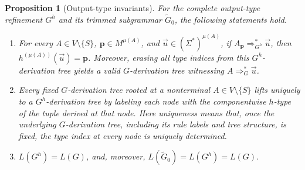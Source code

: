 \documentclass[11pt,a4paper]{article}
\newtheorem{proposition}[theorem]{Proposition}
\theoremstyle{remark}
\newcommand{\tuple}[1]{\vec{#1}}
\begin{document}
\begin{proposition}[Output-type invariants]
\label{prop:output-invariants}
For the complete output-type refinement \(G^h\) and its trimmed subgrammar
\(\widetilde G_0\), the following statements hold.
\begin{enumerate}[label=(\roman*),leftmargin=*]
\item For every \(A\in V\setminus\{S\}\),
      \(\mathbf p\in M^{\mu(A)}\), and
      \(\tuple u\in(\Sigma^*)^{\mu(A)}\), if
      \(A_{\mathbf p}\Rightarrow_{G^h}^*\tuple u\), then
      \(h^{(\mu(A))}(\tuple u)=\mathbf p\).  Moreover, erasing all type
      indices from this \(G^h\)-derivation tree yields a valid
      \(G\)-derivation tree witnessing \(A\Rightarrow_G^*\tuple u\).

\item Every fixed \(G\)-derivation tree rooted at a nonterminal
      \(A\in V\setminus\{S\}\) lifts uniquely to a \(G^h\)-derivation tree by
      labeling each node with the componentwise \(h\)-type of the tuple derived
      at that node.  Here uniqueness means that, once the underlying
      \(G\)-derivation tree, including its rule labels and tree structure, is
      fixed, the type index at every node is uniquely determined.

\item \(L(G^h)=L(G)\), and, moreover,
      \(L(\widetilde G_0)=L(G^h)=L(G)\).
\end{enumerate}
\end{proposition}
\end{document}
